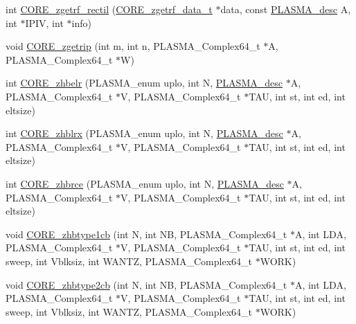 \begin{DoxyCompactItemize}
\item 
int \hyperlink{group__CORE__PLASMA__Complex64__t_ga82c61a41b327ed501d8959f4acd4ce1f_ga82c61a41b327ed501d8959f4acd4ce1f}{C\+O\+R\+E\+\_\+zgetrf\+\_\+rectil} (\hyperlink{structCORE__zgetrf__data__s}{C\+O\+R\+E\+\_\+zgetrf\+\_\+data\+\_\+t} $\ast$data, const \hyperlink{structplasma__desc__t}{P\+L\+A\+S\+M\+A\+\_\+desc} A, int $\ast$I\+P\+I\+V, int $\ast$info)
\item 
void \hyperlink{group__CORE__PLASMA__Complex64__t_ga47110e591a3c8753ac4d766841185860_ga47110e591a3c8753ac4d766841185860}{C\+O\+R\+E\+\_\+zgetrip} (int m, int n, P\+L\+A\+S\+M\+A\+\_\+\+Complex64\+\_\+t $\ast$A, P\+L\+A\+S\+M\+A\+\_\+\+Complex64\+\_\+t $\ast$W)
\item 
int \hyperlink{group__CORE__PLASMA__Complex64__t_gabe868fcc6eddd081e6e239318172aed9_gabe868fcc6eddd081e6e239318172aed9}{C\+O\+R\+E\+\_\+zhbelr} (P\+L\+A\+S\+M\+A\+\_\+enum uplo, int N, \hyperlink{structplasma__desc__t}{P\+L\+A\+S\+M\+A\+\_\+desc} $\ast$A, P\+L\+A\+S\+M\+A\+\_\+\+Complex64\+\_\+t $\ast$V, P\+L\+A\+S\+M\+A\+\_\+\+Complex64\+\_\+t $\ast$T\+A\+U, int st, int ed, int eltsize)
\item 
int \hyperlink{group__CORE__PLASMA__Complex64__t_ga2664b15e120a44f67545f555d3100642_ga2664b15e120a44f67545f555d3100642}{C\+O\+R\+E\+\_\+zhblrx} (P\+L\+A\+S\+M\+A\+\_\+enum uplo, int N, \hyperlink{structplasma__desc__t}{P\+L\+A\+S\+M\+A\+\_\+desc} $\ast$A, P\+L\+A\+S\+M\+A\+\_\+\+Complex64\+\_\+t $\ast$V, P\+L\+A\+S\+M\+A\+\_\+\+Complex64\+\_\+t $\ast$T\+A\+U, int st, int ed, int eltsize)
\item 
int \hyperlink{group__CORE__PLASMA__Complex64__t_gaadf9a706422a10caa1160dfbf8c3bf87_gaadf9a706422a10caa1160dfbf8c3bf87}{C\+O\+R\+E\+\_\+zhbrce} (P\+L\+A\+S\+M\+A\+\_\+enum uplo, int N, \hyperlink{structplasma__desc__t}{P\+L\+A\+S\+M\+A\+\_\+desc} $\ast$A, P\+L\+A\+S\+M\+A\+\_\+\+Complex64\+\_\+t $\ast$V, P\+L\+A\+S\+M\+A\+\_\+\+Complex64\+\_\+t $\ast$T\+A\+U, int st, int ed, int eltsize)
\item 
void \hyperlink{group__CORE__PLASMA__Complex64__t_ga41131186eed1b28cc11670619b9318c0_ga41131186eed1b28cc11670619b9318c0}{C\+O\+R\+E\+\_\+zhbtype1cb} (int N, int N\+B, P\+L\+A\+S\+M\+A\+\_\+\+Complex64\+\_\+t $\ast$A, int L\+D\+A, P\+L\+A\+S\+M\+A\+\_\+\+Complex64\+\_\+t $\ast$V, P\+L\+A\+S\+M\+A\+\_\+\+Complex64\+\_\+t $\ast$T\+A\+U, int st, int ed, int sweep, int Vblksiz, int W\+A\+N\+T\+Z, P\+L\+A\+S\+M\+A\+\_\+\+Complex64\+\_\+t $\ast$W\+O\+R\+K)
\item 
void \hyperlink{group__CORE__PLASMA__Complex64__t_ga24b6ed59ffb20eb7ecebc198a91230fe_ga24b6ed59ffb20eb7ecebc198a91230fe}{C\+O\+R\+E\+\_\+zhbtype2cb} (int N, int N\+B, P\+L\+A\+S\+M\+A\+\_\+\+Complex64\+\_\+t $\ast$A, int L\+D\+A, P\+L\+A\+S\+M\+A\+\_\+\+Complex64\+\_\+t $\ast$V, P\+L\+A\+S\+M\+A\+\_\+\+Complex64\+\_\+t $\ast$T\+A\+U, int st, int ed, int sweep, int Vblksiz, int W\+A\+N\+T\+Z, P\+L\+A\+S\+M\+A\+\_\+\+Complex64\+\_\+t $\ast$W\+O\+R\+K)

\end{DoxyCompactItemize}
